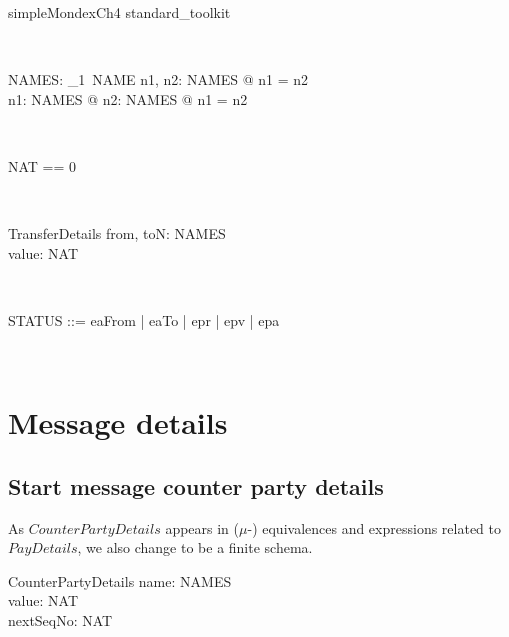 \begin{zsection}
\SECTION simpleMondexCh4 \parents standard\_toolkit
\end{zsection}

\begin{LGSet}
\begin{zed}
  [NAME]
\end{zed}~\end{LGSet}

\begin{LNewADef}
\begin{axdef}
  NAMES: \finset_1~NAME
\where
   \exists n1, n2: NAMES @ \lnot  n1 = n2 \\
  \forall n1: NAMES @ \exists  n2: NAMES @ \lnot  n1 = n2
\end{axdef}~\end{LNewADef}

%
\begin{LNewADef}
\begin{zed}
    NAT == 0 
\end{zed}~\end{LNewADef}

\begin{LSDef}
\begin{schema}{TransferDetails}
   from, toN: NAMES\\
   value: NAT
\end{schema}~\end{LSDef}

\begin{LFType}
\begin{zed}
   STATUS ::= eaFrom | eaTo | epr | epv | epa
\end{zed}~\end{LFType}

\section{Message details}\label{ch4.msgdetails}

\subsection{Start message counter party details}

As $CounterPartyDetails$ appears in ($\mu$-) equivalences
and expressions related to $PayDetails$, we also change
to be a finite schema.
%
\begin{LSDef}
\begin{schema}{CounterPartyDetails}
   name: NAMES \\
   value: NAT \\
   nextSeqNo: NAT
\end{schema}~\end{LSDef}

